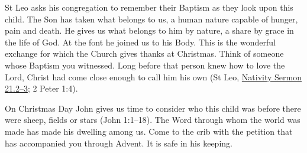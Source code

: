 St Leo asks his congregation to remember their Baptism as they look upon this child. The Son has taken what belongs to us, a human nature capable of hunger, pain and death. He gives us what belongs to him by nature, a share by grace in the life of God. At the font he joined us to his Body. This is the wonderful exchange for which the Church gives thanks at Christmas. Think of someone whose Baptism you witnessed. Long before that person knew how to love the Lord, Christ had come close enough to call him his own (St Leo, \href{https://www.newadvent.org/fathers/360321.htm}{Nativity Sermon 21.2--3}; 2 Peter 1:4).

On Christmas Day John gives us time to consider who this child was before there were sheep, fields or stars (John 1:1--18). The Word through whom the world was made has made his dwelling among us. Come to the crib with the petition that has accompanied you through Advent. It is safe in his keeping.
